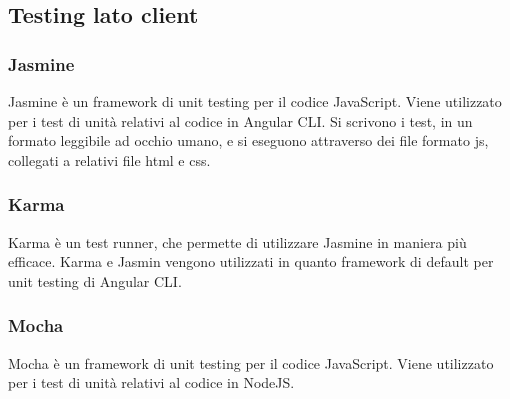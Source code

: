 \subsection{Testing lato client}

\subsubsection{Jasmine}
Jasmine è un framework di unit testing per il codice JavaScript.
Viene utilizzato per i test di unità relativi al codice in Angular CLI.
Si scrivono i test, in un formato leggibile ad occhio umano, e si eseguono attraverso dei file formato js, collegati a relativi file html e css.

\subsubsection{Karma}
Karma è un test runner, che permette di utilizzare Jasmine in maniera più efficace.
Karma e Jasmin vengono utilizzati in quanto framework di default per unit testing di Angular CLI.

\subsubsection{Mocha}
Mocha è un framework di unit testing per il codice JavaScript.
Viene utilizzato per i test di unità relativi al codice in NodeJS.